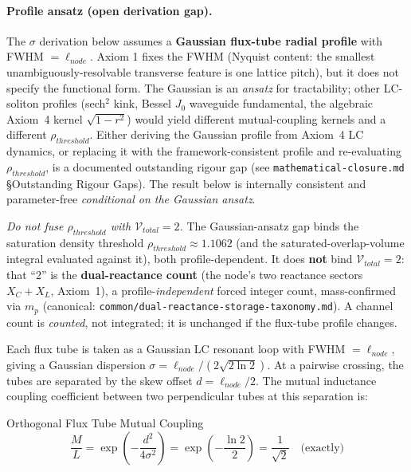 \paragraph{Profile ansatz (open derivation gap).} The $\sigma$ derivation below assumes a \textbf{Gaussian flux-tube radial profile} with FWHM $= \ell_{node}$. Axiom 1 fixes the FWHM (Nyquist content: the smallest unambiguously-resolvable transverse feature is one lattice pitch), but it does not specify the functional form. The Gaussian is an \emph{ansatz} for tractability; other LC-soliton profiles (sech$^2$ kink, Bessel $J_0$ waveguide fundamental, the algebraic Axiom~4 kernel $\sqrt{1-r^2}$) would yield different mutual-coupling kernels and a different $\rho_{threshold}$. Either deriving the Gaussian profile from Axiom~4 LC dynamics, or replacing it with the framework-consistent profile and re-evaluating $\rho_{threshold}$, is a documented outstanding rigour gap (see \texttt{mathematical-closure.md} \S Outstanding Rigour Gaps). The result below is internally consistent and parameter-free \emph{conditional on the Gaussian ansatz}.

\emph{Do not fuse $\rho_{threshold}$ with $\mathcal{V}_{total} = 2$.} The Gaussian-ansatz gap binds the saturation density threshold $\rho_{threshold} \approx 1.1062$ (and the saturated-overlap-volume integral evaluated against it), both profile-dependent. It does \textbf{not} bind $\mathcal{V}_{total} = 2$: that ``2'' is the \textbf{dual-reactance count} (the node's two reactance sectors $X_C + X_L$, Axiom~1), a profile-\emph{independent} forced integer count, mass-confirmed via $m_p$ (canonical: \texttt{common/dual-reactance-storage-taxonomy.md}). A channel count is \emph{counted}, not integrated; it is unchanged if the flux-tube profile changes.

Each flux tube is taken as a Gaussian LC resonant loop with FWHM $= \ell_{node}$, giving a Gaussian dispersion $\sigma = \ell_{node}/(2\sqrt{2\ln 2})$. At a pairwise crossing, the tubes are separated by the skew offset $d = \ell_{node}/2$. The mutual inductance coupling coefficient between two perpendicular tubes at this separation is:
\begin{resultbox}{Orthogonal Flux Tube Mutual Coupling}
\begin{equation}
    \frac{M}{L} = \exp\!\left(-\frac{d^2}{4\sigma^2}\right) = \exp\!\left(-\frac{\ln 2}{2}\right) = \frac{1}{\sqrt{2}} \quad \text{(exactly)}
\end{equation}
\end{resultbox}

